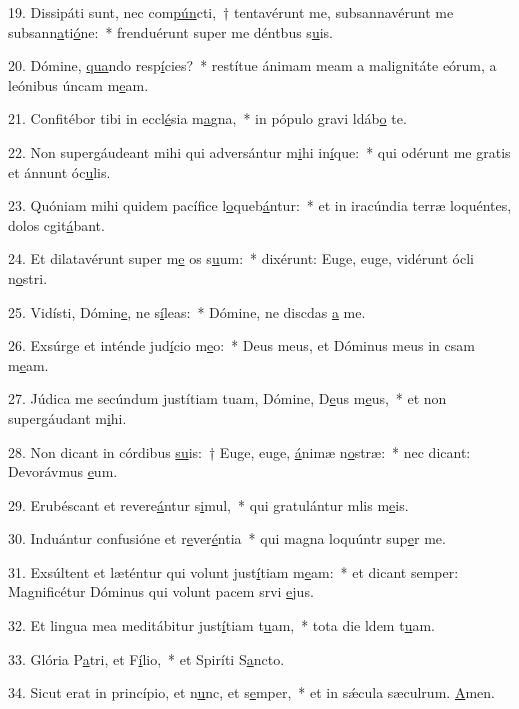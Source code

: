 19. Dissipáti sunt, nec com\uline{pún}cti,~† tentavérunt me, subsannavérunt me subsann\uline{a}ti\uline{ó}ne:~* frenduérunt super me déntbus s\uline{u}is.\par 
20. Dómine, \uline{qua}ndo resp\uline{í}cies?~* restítue ánimam meam a malignitáte eórum, a leónibus úncam m\uline{e}am.\par 
21. Confitébor tibi in eccl\uline{é}sia m\uline{a}gna,~* in pópulo gravi ldáb\uline{o} te.\par 
22. Non supergáudeant mihi qui adversántur m\uline{i}hi in\uline{í}que:~* qui odérunt me gratis et ánnunt óc\uline{u}lis.\par 
23. Quóniam mihi quidem pacífice l\uline{o}queb\uline{á}ntur:~* et in iracúndia terræ loquéntes, dolos cgit\uline{á}bant.\par 
24. Et dilatavérunt super m\uline{e} os s\uline{u}um:~* dixérunt: Euge, euge, vidérunt ócli n\uline{o}stri.\par 
25. Vidísti, Dómin\uline{e}, ne s\uline{í}leas:~* Dómine, ne discdas \uline{a} me.\par 
26. Exsúrge et inténde jud\uline{í}cio m\uline{e}o:~* Deus meus, et Dóminus meus in csam m\uline{e}am.\par 
27. Júdica me secúndum justítiam tuam, Dómine, D\uline{e}us m\uline{e}us,~* et non supergáudant m\uline{i}hi.\par 
28. Non dicant in córdibus \uline{su}is:~† Euge, euge, \uline{á}nimæ n\uline{o}stræ:~* nec dicant: Devorávmus \uline{e}um.\par 
29. Erubéscant et revere\uline{á}ntur s\uline{i}mul,~* qui gratulántur mlis m\uline{e}is.\par 
30. Induántur confusióne et r\uline{e}ver\uline{é}ntia~* qui magna loquúntr sup\uline{e}r me.\par 
31. Exsúltent et læténtur qui volunt just\uline{í}tiam m\uline{e}am:~* et dicant semper: Magnificétur Dóminus qui volunt pacem srvi \uline{e}jus.\par 
32. Et lingua mea meditábitur just\uline{í}tiam t\uline{u}am,~* tota die ldem t\uline{u}am.\par 
33. Glória P\uline{a}tri, et F\uline{í}lio,~* et Spiríti S\uline{a}ncto.\par 
34. Sicut erat in princípio, et n\uline{u}nc, et s\uline{e}mper,~* et in sǽcula sæculrum. \uline{A}men.\par 
